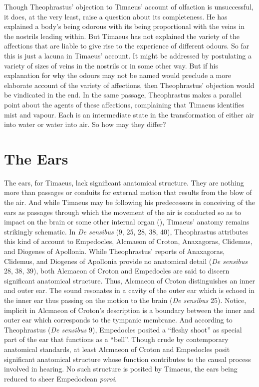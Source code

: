 Though Theophrastus' objection to Timaeus' account of olfaction is unsuccessful, it does, at the very least, raise a question  about its completeness. He has explained a body's being odorous with its being proportional with the veins in the nostrils leading within. But Timaeus has not explained the variety of the affections that are liable to give rise to the experience of different odours. So far this is just a lacuna in Timaeus' account. It might be addressed by postulating a variety of sizes of veins in the nostrils or in some other way. But if his explanation for why the odours may not be named would preclude a more elaborate account of the variety of affections, then Theophrastus' objection would be vindicated in the end. In the same passage, Theophrastus makes a parallel point about the agents of these affections, complaining that Timaeus identifies mist and vapour. Each is an intermediate state in the transformation of either air into water or water into air. So how may they differ?


\section{The Ears} %
\label{sec:the_ears}

The ears, for Timaeus, lack significant anatomical structure. They are nothing more than passages or conduits for external motion that results from the blow of the air. And while Timaeus may be following his predecessors in conceiving of the ears as passages through which the movement of the air is conducted so as to impact on the brain or some other internal organ (\citealt[94]{Beare:1906uq}), Timaeus' anatomy remains strikingly schematic. In \emph{De sensibus} (9, 25, 28, 38, 40), Theophrastus attributes this kind of account to Empedocles, Alcmaeon of Croton, Anaxagoras, Clidemus, and Diogenes of Apollonia. While Theophrastus' reports of Anaxagoras, Clidemus, and Diogenes of Apollonia provide no anatomical detail (\emph{De sensibus} 28, 38, 39), both Alcmaeon of Croton and Empedocles are said to discern significant anatomical structure. Thus, Alcmaeon of Croton distinguishes an inner and outer ear. The sound resonates in a cavity of the outer ear which is echoed in the inner ear thus passing on the motion to the brain (\emph{De sensibus} 25). Notice, implicit in Alcmaeon of Croton's description is a boundary between the inner and outer ear which corresponds to the tympanic membrane. And according to Theophrastus (\emph{De sensibus} 9), Empedocles posited a ``fleshy shoot'' as special part of the ear that functions as a ``bell''. Though crude by contemporary anatomical standards, at least Alcmaeon of Croton and Empedocles posit significant anatomical structure whose function contributes to the causal process involved in hearing. No such structure is posited by Timaeus, the ears being reduced to sheer Empedoclean \emph{poroi}.

